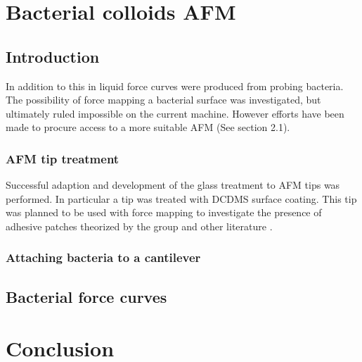 \chapter{Bacterial colloids AFM}

\section{Introduction}

In addition to this in liquid force curves were produced from probing bacteria. The possibility of force mapping a bacterial surface was investigated, but ultimately ruled impossible on the current machine. However efforts have been made to procure access to a more suitable AFM (See section 2.1).

\subsection{AFM tip treatment} %

Successful adaption and development of the glass treatment to AFM tips was performed. In particular a tip was treated with DCDMS surface coating. This tip was planned to be used with force mapping to investigate the presence of adhesive patches theorized by the group \cite{Teun1} and other literature \cite{Patchy}. 

\subsection{Attaching bacteria to a cantilever}
\newpage

\section{Bacterial force curves}

\newpage
\newpage
\newpage

\chapter{Conclusion}